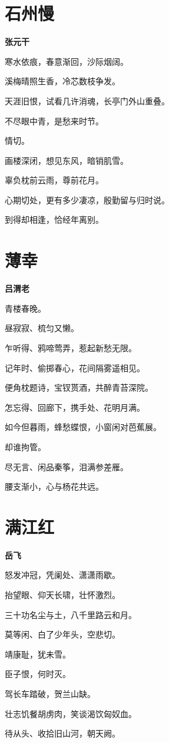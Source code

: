 \documentclass[12pt,a4paper]{ctexbook}
\begin{document}
\section{石州慢}
\textbf{张元干}\par\vspace{0.5em}
寒水依痕，春意渐回，沙际烟阔。\par
溪梅晴照生香，冷芯数枝争发。\par
天涯旧恨，试看几许消魂，长亭门外山重叠。\par
不尽眼中青，是愁来时节。\par
情切。\par
画楼深闭，想见东风，暗销肌雪。\par
辜负枕前云雨，尊前花月。\par
心期切处，更有多少凄凉，殷勤留与归时说。\par
到得却相逢，恰经年离别。\par

\section{薄幸}
\textbf{吕渭老}\par\vspace{0.5em}
青楼春晚。\par
昼寂寂、梳匀又懒。\par
乍听得、鸦啼莺弄，惹起新愁无限。\par
记年时、偷掷春心，花间隔雾遥相见。\par
便角枕题诗，宝钗贳酒，共醉青苔深院。\par
怎忘得、回廊下，携手处、花明月满。\par
如今但暮雨，蜂愁蝶恨，小窗闲对芭蕉展。\par
却谁拘管。\par
尽无言、闲品秦筝，泪满参差雁。\par
腰支渐小，心与杨花共远。\par

\section{满江红}
\textbf{岳飞}\par\vspace{0.5em}
怒发冲冠，凭阑处、潇潇雨歇。\par
抬望眼、仰天长啸，壮怀激烈。\par
三十功名尘与土，八千里路云和月。\par
莫等闲、白了少年头，空悲切。\par
靖康耻，犹未雪。\par
臣子恨，何时灭。\par
驾长车踏破，贺兰山缺。\par
壮志饥餐胡虏肉，笑谈渴饮匈奴血。\par
待从头、收拾旧山河，朝天阙。\par
\end{document}
